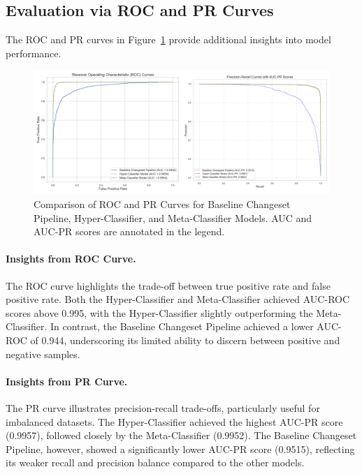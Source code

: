\documentclass[
    13pt, %
    a4paper, %
    listof=totoc, %
    bibliography=totoc, %
    index=totoc, %
    headsepline
]{scrreprt}
\begin{document}
\subsection{Evaluation via ROC and PR Curves}

The ROC and PR curves in Figure~\ref{fig:auc_pr_roc} provide additional insights into model performance. 

\begin{figure}[H]
    \centering
    \includegraphics[width=\textwidth]{auc-pr-roc.png}
    \caption{Comparison of ROC and PR Curves for Baseline Changeset Pipeline, Hyper-Classifier, and Meta-Classifier Models. AUC and AUC-PR scores are annotated in the legend.}
    \label{fig:auc_pr_roc}
\end{figure}

\paragraph{Insights from ROC Curve.}
The ROC curve highlights the trade-off between true positive rate and false positive rate. Both the Hyper-Classifier and Meta-Classifier achieved AUC-ROC scores above 0.995, with the Hyper-Classifier slightly outperforming the Meta-Classifier. In contrast, the Baseline Changeset Pipeline achieved a lower AUC-ROC of 0.944, underscoring its limited ability to discern between positive and negative samples.

\paragraph{Insights from PR Curve.}
The PR curve illustrates precision-recall trade-offs, particularly useful for imbalanced datasets. The Hyper-Classifier achieved the highest AUC-PR score (0.9957), followed closely by the Meta-Classifier (0.9952). The Baseline Changeset Pipeline, however, showed a significantly lower AUC-PR score (0.9515), reflecting its weaker recall and precision balance compared to the other models.
\end{document}
